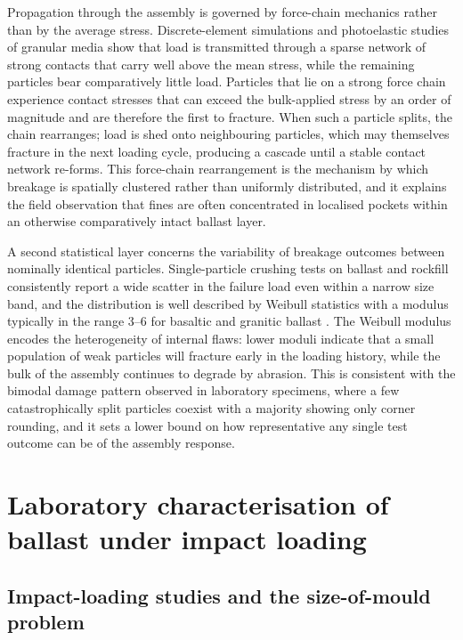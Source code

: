 Propagation through the assembly is governed by force-chain mechanics
rather than by the average stress. Discrete-element simulations and
photoelastic studies of granular media \citep{Cundall1979, Tordesillas2007}
show that load is transmitted through a sparse network of strong contacts
that carry well above the mean stress, while the remaining particles bear
comparatively little load. Particles that lie on a strong force chain
experience contact stresses that can exceed the bulk-applied stress by an
order of magnitude and are therefore the first to fracture. When such a
particle splits, the chain rearranges; load is shed onto neighbouring
particles, which may themselves fracture in the next loading cycle,
producing a cascade until a stable contact network re-forms. This
force-chain rearrangement is the mechanism by which breakage is spatially
clustered rather than uniformly distributed, and it explains the field
observation that fines are often concentrated in localised pockets within
an otherwise comparatively intact ballast layer.

A second statistical layer concerns the variability of breakage outcomes
between nominally identical particles. Single-particle crushing tests on
ballast and rockfill consistently report a wide scatter in the failure
load even within a narrow size band, and the distribution is well
described by Weibull statistics with a modulus typically in the range
\numrange{3}{6} for basaltic and granitic ballast
\citep{McDowell2002, Lim2004}. The Weibull modulus encodes the
heterogeneity of internal flaws: lower moduli indicate that a small
population of weak particles will fracture early in the loading history,
while the bulk of the assembly continues to degrade by abrasion. This is
consistent with the bimodal damage pattern observed in laboratory
specimens, where a few catastrophically split particles coexist with a
majority showing only corner rounding, and it sets a lower bound on how
representative any single test outcome can be of the assembly response.

\section{Laboratory characterisation of ballast under impact loading}
\label{sec:lit-lab}

\subsection{Impact-loading studies and the size-of-mould problem}
\label{sec:lit-impact-mould}

